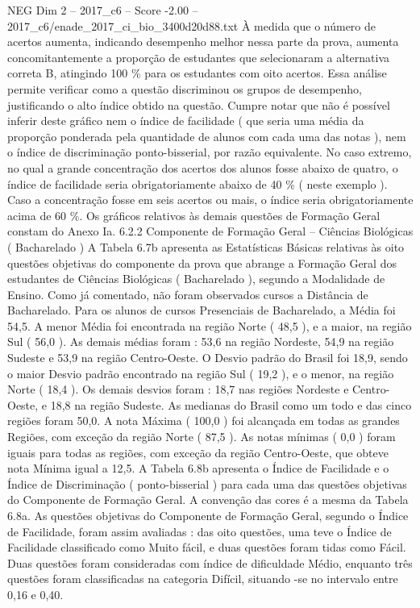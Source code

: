 \begin{textsample}{NEG Dim 2 – 2017\_c6 – Score -2.00 – 2017\_c6/enade\_2017\_ci\_bio\_3400d20d88.txt}
À medida que o número de acertos aumenta, indicando desempenho melhor nessa parte da prova, aumenta concomitantemente a proporção de estudantes que selecionaram a alternativa correta B, atingindo 100 \% para os estudantes com oito acertos.
Essa análise permite verificar como a questão discriminou os grupos de desempenho, justificando o alto índice obtido na questão.
Cumpre notar que não é possível inferir deste gráfico nem o índice de facilidade ( que seria uma média da proporção ponderada pela quantidade de alunos com cada uma das notas ), nem o índice de discriminação ponto-bisserial, por razão equivalente.
No caso extremo, no qual a grande concentração dos acertos dos alunos fosse abaixo de quatro, o índice de facilidade seria obrigatoriamente abaixo de 40 \% ( neste exemplo ).
Caso a concentração fosse em seis acertos ou mais, o índice seria obrigatoriamente acima de 60 \%.
Os gráficos relativos às demais questões de Formação Geral constam do Anexo Ia. 6.2.2 Componente de Formação Geral – Ciências Biológicas ( Bacharelado ) A Tabela 6.7b apresenta as Estatísticas Básicas relativas às oito questões objetivas do componente da prova que abrange a Formação Geral dos estudantes de Ciências Biológicas ( Bacharelado ), segundo a Modalidade de Ensino.
Como já comentado, não foram observados cursos a Distância de Bacharelado.
Para os alunos de cursos Presenciais de Bacharelado, a Média foi 54,5.
A menor Média foi encontrada na região Norte ( 48,5 ), e a maior, na região Sul ( 56,0 ).
As demais médias foram : 53,6 na região Nordeste, 54,9 na região Sudeste e 53,9 na região Centro-Oeste.
O Desvio padrão do Brasil foi 18,9, sendo o maior Desvio padrão encontrado na região Sul ( 19,2 ), e o menor, na região Norte ( 18,4 ).
Os demais desvios foram : 18,7 nas regiões Nordeste e Centro-Oeste, e 18,8 na região Sudeste.
As medianas do Brasil como um todo e das cinco regiões foram 50,0.
A nota Máxima ( 100,0 ) foi alcançada em todas as grandes Regiões, com exceção da região Norte ( 87,5 ).
As notas mínimas ( 0,0 ) foram iguais para todas as regiões, com exceção da região Centro-Oeste, que obteve nota Mínima igual a 12,5.
A Tabela 6.8b apresenta o Índice de Facilidade e o Índice de Discriminação ( ponto-bisserial ) para cada uma das questões objetivas do Componente de Formação Geral.
A convenção das cores é a mesma da Tabela 6.8a.
As questões objetivas do Componente de Formação Geral, segundo o Índice de Facilidade, foram assim avaliadas : das oito questões, uma teve o Índice de Facilidade classificado como Muito fácil, e duas questões foram tidas como Fácil.
Duas questões foram consideradas com índice de dificuldade Médio, enquanto três questões foram classificadas na categoria Difícil, situando -se no intervalo entre 0,16 e 0,40.

\end{textsample}
